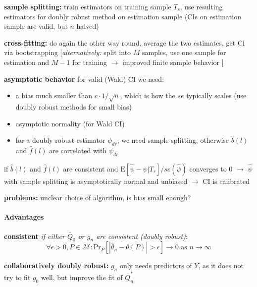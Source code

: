 \documentclass[8pt,twoside]{extarticle}
\begin{document}
\begin{multicols}{2}
\noindent \textbf{sample splitting:} train estimators on training sample $T_r$, use resulting estimators for doubly robust method on estimation sample (CIs on estimation sample are valid, but $n$ halved)

\noindent \textbf{cross-fitting:} do again the other way round, average the two estimates, get CI via bootstrapping
[\textit{alternatively:} split into $M$ samples, use one sample for estimation and $M{-}1$ for training $\to$ improved finite sample behavior \citep{hernan2023causal}]



\noindent \textbf{asymptotic behavior} 
for valid (Wald) CI we need:
\begin{itemize}[leftmargin=*, itemsep=0em, topsep=0pt, partopsep=0pt,parsep=0pt]
\item a bias  much smaller than $c \cdot 1/\sqrt{n}$, which is how the $se$ typically scales (use doubly robust methods for small bias)
\item asymptotic normality (for Wald CI)
\item for a doubly robust estimator $\psi_{dr}$, we need sample splitting, otherwise $\hat{b}(l)$ and $\hat{f}(l)$ are correlated with $\psi_{dr}$
\end{itemize}

\noindent if $\hat{b}(l)$ and $\hat{f}(l)$ are consistent and $\mathrm{E}[\hat{\psi} - \psi|T_r]/se(\hat{\psi})$ converges to 0 $\to$ $\hat{\psi}$ with sample splitting is asymptotically normal and unbiased $\to$ CI is calibrated
\citep{hernan2023causal}


\noindent \textbf{problems:} unclear choice of algorithm, is bias small enough?

\paragraph{Advantages} \citep{van2011targeted}

\noindent \textbf{consistent} \textit{if either $\bar{Q}_0$ or $g_n$ are consistent (doubly robust)}:
$$\forall \epsilon>0, P \in \mathcal{M}: \mathrm{Pr}_P\left[|\hat{\theta}_n-\theta(P)|>\epsilon\right] \to 0 \text{ as } n\to\infty$$

\noindent \textbf{collaboratively doubly robust:} $g_n$ only needs predictors of $Y$, as it does not try to fit $g_0$ well, but improve the fit of $\bar{Q}^*_n$


\end{multicols}
\end{document}
